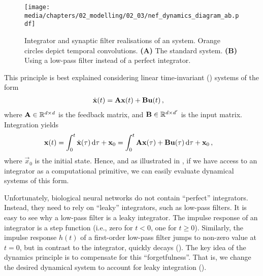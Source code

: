 \begin{figure}
	\centering
	\texttt{[image: media/chapters/02\_modelling/02\_03/nef\_dynamics\_diagram\_ab.pdf]}
	{\label{fig:nef_dynamics_integral}}%
	{\label{fig:nef_dynamics_synaptic}}%
	\caption[Integrator and synaptic filter realisations of an LTI system]{Integrator and synaptic filter realisations of an \LTI system. Orange circles depict temporal convolutions.
	\textbf{(A)} The standard \LTI system.
	\textbf{(B)} Using a low-pass filter instead of a perfect integrator.}
	\label{fig:nef_dynamics_ab}
\end{figure}

This principle is best explained considering linear time-invariant (\LTI) systems of the form
\begin{align*}
	\dot{\mathbf{x}}(t) &= \mathbf{A} \mathbf{x}(t) + \mathbf{B} \mathbf{u}(t) \,,
\end{align*}
where $\mathbf{A} \in \mathbb{R}^{d \times d}$ is the feedback matrix, and $\mathbf{B} \in \mathbb{R}^{d \times d'}$ is the input matrix.
Integration yields
\begin{align}
	\mathbf{x}(t)
	&=
		\int_0^t \dot{\mathbf{x}}(\tau) \,\mathrm{d}\tau + \mathbf{x}_0
	=
		\int_0^t \mathbf{A} \mathbf{x}(\tau) + \mathbf{B} \mathbf{u}(\tau) \,\mathrm{d}\tau + \mathbf{x}_0 \,,
	\label{eqn:lti_integral_equation}
\end{align}
where $\vec x_0$ is the initial state.
Hence, and as illustrated in , if we have access to an integrator as a computational primitive, we can easily evaluate dynamical systems of this form.

Unfortunately, biological neural networks do not contain \enquote{perfect} integrators.
Instead, they need to rely on \enquote{leaky} integrators, such as low-pass filters.
It is easy to see why a low-pass filter is a leaky integrator.
The impulse response of an integrator is a step function (i.e., zero for $t < 0$, one for $t \geq 0$).
Similarly, the impulse response $h(t)$ of a first-order low-pass filter jumps to non-zero value at $t = 0$, but in contrast to the integrator, quickly decays ().
The key idea of the dynamics principle is to compensate for this \enquote{forgetfulness}.
That is, we change the desired dynamical system to account for leaky integration ().

